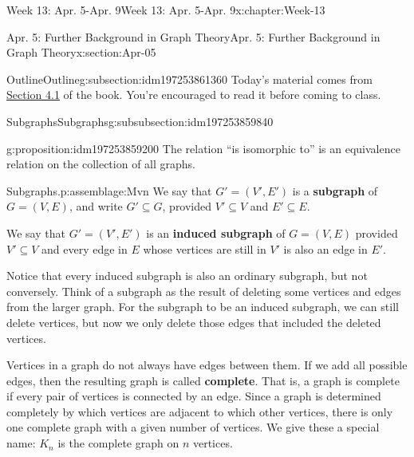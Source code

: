 \documentclass[oneside,10pt,]{book}
\newcommand{\terminology}[1]{\textbf{#1}}
\numberwithin{equation}{section}
\begin{document}
\typeout{************************************************}
%
\begin{chapterptx}{Week 13: Apr. 5-Apr. 9}{}{Week 13: Apr. 5-Apr. 9}{}{}{x:chapter:Week-13}
%
%
\typeout{************************************************}
\typeout{************************************************}
%
\begin{sectionptx}{Apr. 5: Further Background in Graph Theory}{}{Apr. 5: Further Background in Graph Theory}{}{}{x:section:Apr-05}
%
%
\typeout{************************************************}
\typeout{************************************************}
%
\begin{subsectionptx}{Outline}{}{Outline}{}{}{g:subsection:idm197253861360}
Today's material comes from \href{http://discrete.openmathbooks.org/dmoi3/sec_gt-intro.html}{Section 4.1} of the book. You're encouraged to read it before coming to class.%
%
%
\typeout{************************************************}
\typeout{************************************************}
%
\begin{subsubsectionptx}{Subgraphs}{}{Subgraphs}{}{}{g:subsubsection:idm197253859840}
\begin{proposition}{}{}{g:proposition:idm197253859200}%
The relation ``is isomorphic to'' is an equivalence relation on the collection of all graphs.%
\end{proposition}
\begin{assemblage}{Subgraphs.}{p:assemblage:Mvn}%
We say that \(G' = (V', E')\) is a \terminology{subgraph} of \(G = (V, E)\), and write \(G' \subseteq G\), provided \(V' \subseteq V\) and \(E' \subseteq E\).%
\par
We say that \(G' = (V', E')\) is an \terminology{induced subgraph} of \(G = (V, E)\) provided \(V' \subseteq V\) and every edge in \(E\) whose vertices are still in \(V'\) is also an edge in \(E'\).%
\end{assemblage}
Notice that every induced subgraph is also an ordinary subgraph, but not conversely. Think of a subgraph as the result of deleting some vertices and edges from the larger graph. For the subgraph to be an induced subgraph, we can still delete vertices, but now we only delete those edges that included the deleted vertices.%
\par
{} Vertices in a graph do not always have edges between them. If we add all possible edges, then the resulting graph is called \terminology{complete}. That is, a graph is complete if every pair of vertices is connected by an edge. Since a graph is determined completely by which vertices are adjacent to which other vertices, there is only one complete graph with a given number of vertices. We give these a special name: \(K_n\) \label{g:notation:idm197253843840} is the complete graph on \(n\) vertices.%

\end{subsubsectionptx}
\end{subsectionptx}
\end{sectionptx}
\end{chapterptx}
\end{document}
